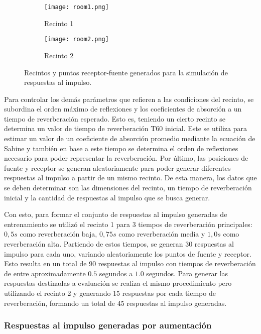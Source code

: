 \begin{figure}[H]
\centering
\begin{subfigure}{.5\textwidth}
  \centering
  \texttt{[image: room1.png]}
  \caption{Recinto 1}
  \label{fig:sub1}
\end{subfigure}%
\begin{subfigure}{.5\textwidth}
  \centering
  \texttt{[image: room2.png]}
  \caption{Recinto 2}
  \label{fig:sub2}
\end{subfigure}
\caption{Recintos y puntos receptor-fuente generados para la simulación de respuestas al impulso.}
\label{fig:recintos}
\end{figure}

Para controlar los demás parámetros que refieren a las condiciones del recinto, se subordina el orden máximo de reflexiones y los coeficientes de absorción a un tiempo de reverberación esperado. Esto es, teniendo un cierto recinto se determina un valor de tiempo de reverberación T60 inicial. Este se utiliza para estimar un valor de un coeficiente de absorción promedio mediante la ecuación de Sabine y también en base a este tiempo se determina el orden de reflexiones necesario para poder representar la reverberación. 
Por último, las posiciones de fuente y receptor se generan aleatoriamente para poder generar diferentes respuestas al impulso a partir de un mismo recinto. De esta manera, los datos que se deben determinar son las dimensiones del recinto, un tiempo de reverberación inicial y la cantidad de respuestas al impulso que se busca generar. 

Con esto, para formar el conjunto de respuestas al impulso generadas de entrenamiento se utilizó el recinto 1 para 3 tiempos de reverberación principales: $0,5 s$ como reverberación baja, $0,75 s$ como reverberación media y $1,0 s$ como reverberación alta. Partiendo de estos tiempos, se generan 30 respuestas al impulso para cada uno, variando aleatoriamente los puntos de fuente y receptor. Esto resulta en un total de 90 respuestas al impulso con tiempos de reverberación de entre aproximadamente $0.5$ segundos a $1.0$ segundos. Para generar las respuestas destinadas a evaluación se realiza el mismo procedimiento pero utilizando el recinto 2 y generando 15 respuestas por cada tiempo de reverberación, formando un total de 45 respuestas al impulso generadas. 

\subsubsection{Respuestas al impulso generadas por aumentación}

